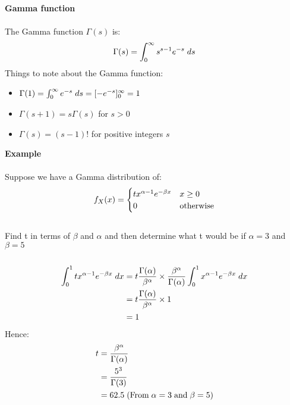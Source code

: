 \documentclass[,oneside]{article}
\begin{document}
\begin{enumerate}
\textbf{Gamma function}\\ \\
The Gamma function $\Gamma(s)$ is:
\begin{align*}
\Gamma(s)=\int_{0}^{\infty}s^{s-1}e^{-s}\hspace{0.1cm}ds
\end{align*}
Things to note about the Gamma function:
\begin{itemize}
\item $\Gamma(1) = \int_{0}^{\infty} e^{-s}\hspace{0.1cm}ds = [-e^{-s}]_{0}^{\infty}=1$
\item $\Gamma(s+1) = s\Gamma(s)$ for $s > 0 $
\item $\Gamma(s)=(s-1)!$ for positive integers $s$\\
\end{itemize}
\textbf{Example}\\ \\
Suppose we have a Gamma distribution of:\\
\[
f_X(x)=
\begin{cases}
t x^{\alpha-1}e^{-\beta x} &  x \geq 0\\
0 & $otherwise$
\end{cases} \] \\
Find t in terms of $\beta$ and $\alpha$ and then determine what t would be if $\alpha = 3$ and $\beta = 5$\\ \\ 
\begin{align*}
\int_{0}^{1} t x^{\alpha-1}e^{-\beta x} \hspace{0.1cm}dx &= t \frac{\Gamma{(\alpha)}}{\beta^{\alpha}} \times \frac{\beta^{\alpha}}{\Gamma{(\alpha)}} \int_{0}^{1}  x^{\alpha-1}e^{-\beta x} \hspace{0.1cm}dx \\
&= t \frac{\Gamma{(\alpha)}}{\beta^{\alpha}} \times 1\\
&= 1
\end{align*}
Hence:
\begin{align*}
t &= \frac{\beta^{\alpha}}{\Gamma{(\alpha)}}\\
&= \frac{5^{3}}{\Gamma{(3)}}\\
&= 62.5\hspace{0.1cm}(\text{From}\hspace{0.1cm}\alpha = 3 \hspace{0.1cm}\text{and}\hspace{0.1cm}\beta = 5)
\end{align*}

\end{enumerate}
\end{document}
